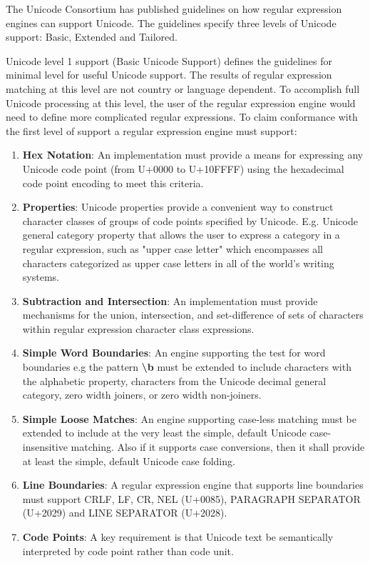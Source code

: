 The Unicode Consortium has published guidelines \cite{unicodeguideline} on how regular expression engines can support Unicode. The guidelines specify three levels of Unicode support: Basic, Extended and Tailored.

Unicode level 1 support (Basic Unicode Support) defines the guidelines for minimal level for useful Unicode support. The results of regular expression matching at this level are not country or language dependent. To accomplish full Unicode processing at this level, the user of the regular expression engine would need to define more complicated regular expressions. To claim conformance with the first level of support a regular expression engine must support:

\begin{enumerate}
    \item \textbf{Hex Notation}: An implementation must provide a means for expressing any Unicode code point (from U+0000 to U+10FFFF) using the hexadecimal code point encoding to meet this criteria.
    \item \textbf{Properties}: Unicode properties provide a convenient way to construct character classes of groups of code points specified by Unicode. E.g. Unicode general category property that allows the user to express a category in a regular expression, such as "upper case letter" which encompasses all characters categorized as upper case letters in all of the world's writing systems.
    \item \textbf{Subtraction and Intersection}: An implementation must provide mechanisms for the union, intersection, and set-difference of sets of characters within regular expression character class expressions.
    \item \textbf{Simple Word Boundaries}: An engine supporting the test for word boundaries e.g the pattern \textbf{\textbackslash b} must be extended to include characters with the alphabetic property, characters from the Unicode decimal general category, zero width joiners, or zero width non-joiners.
    \item \textbf{Simple Loose Matches}: An engine supporting case-less matching must be extended to include at the very least the simple, default Unicode case-insensitive matching. Also if it supports case conversions, then it shall provide at least the simple, default Unicode case folding.
    \item \textbf{Line Boundaries}: A regular expression engine that supports line boundaries must support CRLF, LF, CR, NEL (U+0085), PARAGRAPH SEPARATOR (U+2029) and LINE SEPARATOR (U+2028).
    \item \textbf{Code Points}: A key requirement is that Unicode text be semantically interpreted by code point rather than code unit.
\end{enumerate}


